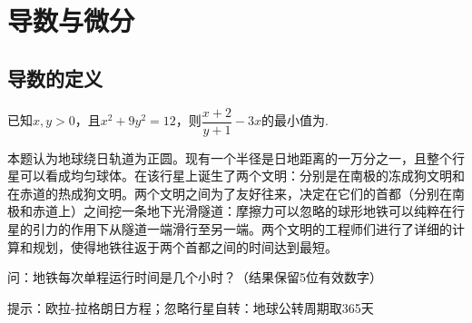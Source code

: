 \chapter{导数与微分}
\section{导数的定义}
\begin{example}{}{}
    已知$x,y>0$，且$x^2+9y^2=12$，则$\dfrac{x+2}{y+1}-3x$的最小值为\underline{\hspace{2cm}}.
\end{example}
\begin{example}{}{}
    本题认为地球绕日轨道为正圆。现有一个半径是日地距离的一万分之一，且整个行星可以看成均匀球体。在该行星上诞生了两个文明：分别是在南极的冻成狗文明和在赤道的热成狗文明。两个文明之间为了友好往来，决定在它们的首都（分别在南极和赤道上）之间挖一条地下光滑隧道：摩擦力可以忽略的球形地铁可以纯粹在行星的引力的作用下从隧道一端滑行至另一端。两个文明的工程师们进行了详细的计算和规划，使得地铁往返于两个首都之间的时间达到最短。
    
    问：地铁每次单程运行时间是几个小时？（结果保留5位有效数字）
    
    提示：欧拉-拉格朗日方程；忽略行星自转：地球公转周期取365天
\end{example}
